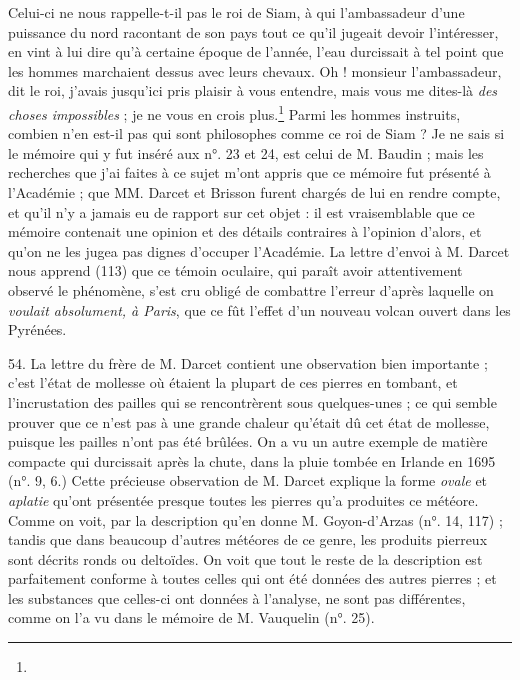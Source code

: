 \documentclass[a4paper, 11pt, oneside, polutonikogreek, french]{article}
\begin{document}
{{\hspace*{5mm}Celui-ci ne nous rappelle-t-il pas le roi de Siam, à qui l'ambassadeur d'une puissance du nord racontant de son pays tout ce qu'il jugeait devoir l'intéresser, en vint à lui dire qu'à certaine époque de l'année, l'eau durcissait à tel point que les hommes marchaient dessus avec leurs chevaux. \og Oh ! monsieur l'ambassadeur, dit le roi, j'avais jusqu'ici pris plaisir à vous entendre, mais vous me dites-là \emph{des choses impossibles} ; je ne vous en crois plus.\footnote{} \fg Parmi les hommes instruits, combien n'en est-il pas qui sont philosophes comme ce roi de Siam ?}} Je ne sais si le mémoire qui y fut inséré aux n°. 23 et 24, est celui de M. Baudin ; mais les recherches que j'ai faites à ce sujet m'ont appris que ce mémoire fut présenté à l'Académie ; que MM. Darcet et Brisson furent chargés de lui en rendre compte, et qu'il n'y a jamais eu de rapport sur cet objet : il est vraisemblable que ce mémoire contenait une opinion et des détails contraires à l'opinion d'alors, et qu'on ne les jugea pas dignes d'occuper l'Académie. La lettre d'envoi à M. Darcet nous apprend (113) que ce témoin oculaire, qui paraît avoir attentivement observé le phénomène, s'est cru obligé de combattre l'erreur d'après laquelle on \emph{voulait absolument, à Paris}, que ce fût l'effet d'un nouveau volcan ouvert dans les Pyrénées.

54. La lettre du frère de M. Darcet contient une observation bien importante ; c'est l'état de mollesse où étaient la plupart de ces pierres en tombant, et l'incrustation des pailles qui se rencontrèrent sous quelques-unes ; ce qui semble prouver que ce n'est pas à une grande chaleur qu'était dû cet état de mollesse, puisque les pailles n'ont pas été brûlées. On a vu un autre exemple de matière compacte qui durcissait après la chute, dans la pluie tombée en Irlande en 1695 (n°. 9, 6.) Cette précieuse observation de M. Darcet explique la forme \emph{ovale} et \emph{aplatie} qu'ont présentée presque toutes les pierres qu'a produites ce météore. Comme on voit, par la description qu'en donne M. Goyon-d'Arzas (n°. 14, 117) ; tandis que dans beaucoup d'autres météores de ce genre, les produits pierreux sont décrits ronds ou deltoïdes. On voit que tout le reste de la description est parfaitement conforme à toutes celles qui ont été données des autres pierres ; et les substances que celles-ci ont données à l'analyse, ne sont pas différentes, comme on l’a vu dans le mémoire de M. Vauquelin (n°. 25).
\end{document}
